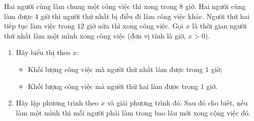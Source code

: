 \begin{bt}
Hai người cùng làm chung một công việc thì xong trong $8$ giờ. Hai người cùng làm được $4$ giờ thì người thứ nhất bị điều đi làm công việc khác. Người thứ hai tiếp tục làm việc trong $12$ giờ nữa thì xong công việc. Gọi $x$ là thời gian người thứ nhất làm một mình xong công việc (đơn vị tính là giờ, $x>0$).
\begin{enumerate}
\item Hãy biểu thị theo $x$:
\begin{itemize}
\item Khối lượng công việc mà người thứ nhất làm được trong $1$ giờ;
\item Khối lượng công việc mà người thứ hai làm được trong $1$ giờ.
\end{itemize}
\item Hãy lập phương trình theo $x$ và giải phương trình đó. Sau đó cho biết, nếu làm một mình thì mỗi người phải làm trong bao lâu mới xong cộng việc đó.
\end{enumerate}
\end{bt}
